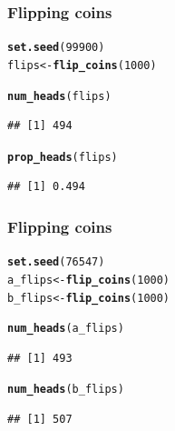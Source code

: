 \documentclass[12pt]{beamer}\usepackage[]{graphicx}\usepackage[]{color}
\makeatletter
\newcommand{\hlnum}[1]{\textcolor[rgb]{0.686,0.059,0.569}{#1}}%
\newcommand{\hlstd}[1]{\textcolor[rgb]{0.345,0.345,0.345}{#1}}%
\newcommand{\hlkwb}[1]{\textcolor[rgb]{0.69,0.353,0.396}{#1}}%
\newcommand{\hlkwd}[1]{\textcolor[rgb]{0.737,0.353,0.396}{\textbf{#1}}}%
\newenvironment{kframe}{%
 \def\at@end@of@kframe{}%
 \ifinner\ifhmode%
  \def\at@end@of@kframe{\end{minipage}}%
  \begin{minipage}{\columnwidth}%
 \fi\fi%
 \def\FrameCommand##1{\hskip\@totalleftmargin \hskip-\fboxsep
 \colorbox{shadecolor}{##1}\hskip-\fboxsep
     \hskip-\linewidth \hskip-\@totalleftmargin \hskip\columnwidth}%
 \MakeFramed {\advance\hsize-\width
   \@totalleftmargin\z@ \linewidth\hsize
   \@setminipage}}%
 {\par\unskip\endMakeFramed%
 \at@end@of@kframe}
\newenvironment{knitrout}{}{} %
\makeatother
\begin{document}

\begin{frame}[fragile]
\frametitle{Flipping coins}

\begin{knitrout}\footnotesize
{}\color{fgcolor}\begin{kframe}
\begin{alltt}
\hlkwd{set.seed}\hlstd{(}\hlnum{99900}\hlstd{)}
\hlstd{flips} \hlkwb{<-} \hlkwd{flip_coins}\hlstd{(}\hlnum{1000}\hlstd{)}

\hlkwd{num_heads}\hlstd{(flips)}
\end{alltt}
\begin{verbatim}
## [1] 494
\end{verbatim}
\begin{alltt}
\hlkwd{prop_heads}\hlstd{(flips)}
\end{alltt}
\begin{verbatim}
## [1] 0.494
\end{verbatim}
\end{kframe}
\end{knitrout}



\end{frame}


\begin{frame}[fragile]
\frametitle{Flipping coins}

\begin{knitrout}\footnotesize
{}\color{fgcolor}\begin{kframe}
\begin{alltt}
\hlkwd{set.seed}\hlstd{(}\hlnum{76547}\hlstd{)}
\hlstd{a_flips} \hlkwb{<-} \hlkwd{flip_coins}\hlstd{(}\hlnum{1000}\hlstd{)}
\hlstd{b_flips} \hlkwb{<-} \hlkwd{flip_coins}\hlstd{(}\hlnum{1000}\hlstd{)}

\hlkwd{num_heads}\hlstd{(a_flips)}
\end{alltt}
\begin{verbatim}
## [1] 493
\end{verbatim}
\begin{alltt}
\hlkwd{num_heads}\hlstd{(b_flips)}
\end{alltt}
\begin{verbatim}
## [1] 507
\end{verbatim}
\end{kframe}
\end{knitrout}

\end{frame}
\end{document}

